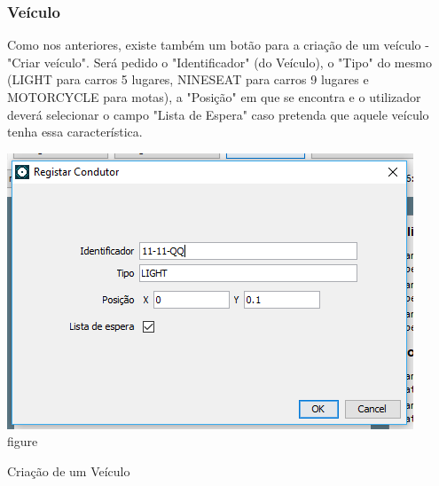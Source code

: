 \documentclass[a4paper]{article}
\begin{document}
\subsubsection{Veículo}
Como nos anteriores, existe também um botão para a criação de um veículo - "Criar veículo". Será pedido o "Identificador" (do Veículo), o "Tipo" do mesmo (LIGHT para carros 5 lugares, NINESEAT para carros 9 lugares e MOTORCYCLE para motas), a "Posição" em que se encontra e o utilizador deverá selecionar o campo "Lista de Espera" caso pretenda que aquele veículo tenha essa característica.
\begin{center}
  \includegraphics[scale=0.75]{criar_veiculo}\\
  \caption{figure}{Criação de um Veículo}
  \label{fig:picture}
\end{center}
\end{document}
